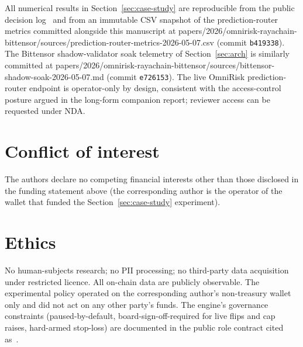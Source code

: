 \documentclass[11pt,a4paper]{article}
\providecommand{\seqsplit}[1]{#1}
\begin{document}
All numerical results in Section~\ref{sec:case-study} are reproducible
from the public decision log~\cite{omnirisk2026defending} and from an
immutable CSV snapshot of the prediction-router metrics committed
alongside this manuscript at
\seqsplit{papers/2026/omnirisk-rayachain-bittensor/sources/prediction-router-metrics-2026-05-07.csv}
(commit \texttt{b419338}). The Bittensor shadow-validator soak
telemetry of Section~\ref{sec:arch} is similarly committed at
\seqsplit{papers/2026/omnirisk-rayachain-bittensor/sources/bittensor-shadow-soak-2026-05-07.md}
(commit \texttt{e726153}). The live OmniRisk prediction-router endpoint
is operator-only by design, consistent with the access-control posture
argued in the long-form companion report; reviewer access can be
requested under NDA.

\section*{Conflict of interest}

The authors declare no competing financial interests other than those
disclosed in the funding statement above (the corresponding author is
the operator of the wallet that funded the
Section~\ref{sec:case-study} experiment).

\section*{Ethics}

No human-subjects research; no PII processing; no third-party data
acquisition under restricted licence. All on-chain data are publicly
observable. The experimental policy operated on the corresponding
author's non-treasury wallet only and did not act on any other party's
funds. The engine's governance constraints (paused-by-default,
board-sign-off-required for live flips and cap raises, hard-armed
stop-loss) are documented in the public role contract cited
as~\cite{omnirisk2026defending}.

\printbibliography
\end{document}
